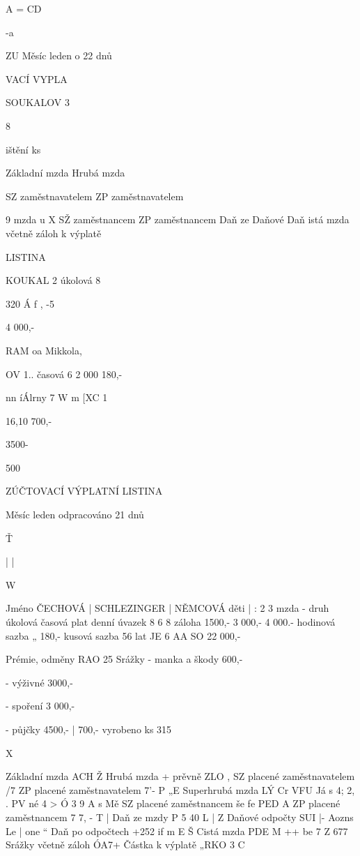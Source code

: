 A
=
CD

-a

ZU
Měsíc leden
o 22 dnů

VACÍ VYPLA

SOUKALOV
3

8

ištění
ks

Základní mzda
Hrubá mzda

SZ zaměstnavatelem
ZP zaměstnavatelem

9 mzda
u X
SŽ zaměstnancem
ZP zaměstnancem
Daň ze
Daňové
Daň
istá mzda
včetně záloh
k výplatě

LISTINA

KOUKAL
2
úkolová
8

320
Á f
, -5%

4 000,-



RAM oa Mikkola,

OV
1..
časová
6
2 000
180,-

nn íÁlrny 7
W m [XC 1

16,10%
700,-

3500-

500
\newpage
















ZÚČTOVACÍ VÝPLATNÍ LISTINA

Měsíc leden
odpracováno 21 dnů



Ť

|
|

W


Jméno ČECHOVÁ | SCHLEZINGER | NĚMCOVÁ
děti | : 2 3
mzda - druh úkolová časová plat
denní úvazek 8 6 8
záloha 1500,- 3 000,- 4 000.-
hodinová sazba „ 180,-
kusová sazba 56
lat JE 6 AA SO 22 000,-

Prémie, odměny RAO 25 %
Srážky - manka a škody 600,-

- výživné 3000,-

- spoření 3 000,-

- půjčky 4500,- | 700,-
vyrobeno ks 315

X

Základní mzda ACH Ž
Hrubá mzda + prěvně ZLO ,
SZ placené zaměstnavatelem /7%
ZP placené zaměstnavatelem 7'- P „E
Superhrubá mzda LÝ Cr VFU
Já s 4; 2, . PV né 4 > Ó 3 9 A s Mě
SZ placené zaměstnancem še fe PED A
ZP placené zaměstnancem 7 7, - T |
Daň ze mzdy P 5 40 L | Z
Daňové odpočty SUI |- Aozns Le | one “
Daň po odpočtech +252 if m E Š
Cistá mzda PDE M ++ be 7 Z 677
Srážky včetně záloh ÓA7+%
Částka k výplatě „RKO 3 C


